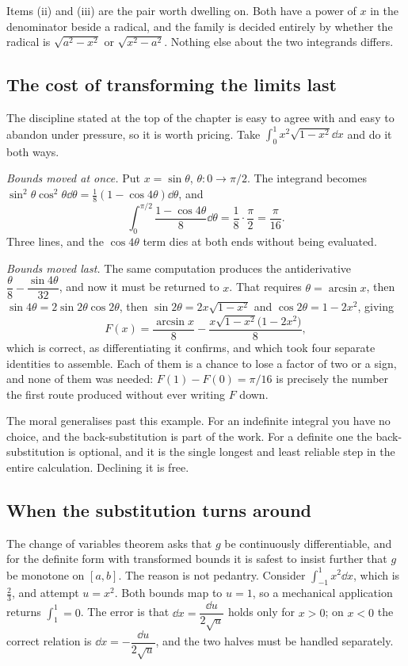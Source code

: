Items (ii) and (iii) are the pair worth dwelling on. Both have a power of $x$ in the denominator beside a radical, and the family is decided entirely by whether the radical is $\sqrt{a^2-x^2}$ or $\sqrt{x^2-a^2}$. Nothing else about the two integrands differs.

\subsection{The cost of transforming the limits last}

The discipline stated at the top of the chapter is easy to agree with and easy to abandon under pressure, so it is worth pricing. Take $\displaystyle\int_0^1x^2\sqrt{1-x^2}\dd x$ and do it both ways.

\emph{Bounds moved at once.} Put $x=\sin\theta$, $\theta:0\to\pi/2$. The integrand becomes $\sin^2\theta\cos^2\theta\dd\theta=\tfrac18(1-\cos4\theta)\dd\theta$, and
\[
\int_0^{\pi/2}\frac{1-\cos4\theta}{8}\dd\theta=\frac{1}{8}\cdot\frac{\pi}{2}=\frac{\pi}{16}.
\]
Three lines, and the $\cos4\theta$ term dies at both ends without being evaluated.

\emph{Bounds moved last.} The same computation produces the antiderivative $\dfrac{\theta}{8}-\dfrac{\sin4\theta}{32}$, and now it must be returned to $x$. That requires $\theta=\arcsin x$, then $\sin4\theta=2\sin2\theta\cos2\theta$, then $\sin2\theta=2x\sqrt{1-x^2}$ and $\cos2\theta=1-2x^2$, giving
\[
F(x)=\frac{\arcsin x}{8}-\frac{x\sqrt{1-x^2}\bigl(1-2x^2\bigr)}{8},
\]
which is correct, as differentiating it confirms, and which took four separate identities to assemble. Each of them is a chance to lose a factor of two or a sign, and none of them was needed: $F(1)-F(0)=\pi/16$ is precisely the number the first route produced without ever writing $F$ down.

The moral generalises past this example. For an indefinite integral you have no choice, and the back-substitution is part of the work. For a definite one the back-substitution is optional, and it is the single longest and least reliable step in the entire calculation. Declining it is free.

\subsection{When the substitution turns around}

The change of variables theorem asks that $g$ be continuously differentiable, and for the definite form with transformed bounds it is safest to insist further that $g$ be monotone on $[a,b]$. The reason is not pedantry. Consider $\int_{-1}^{1}x^2\dd x$, which is $\tfrac23$, and attempt $u=x^2$. Both bounds map to $u=1$, so a mechanical application returns $\int_1^1=0$. The error is that $\dd x=\dfrac{\dd u}{2\sqrt u}$ holds only for $x>0$; on $x<0$ the correct relation is $\dd x=-\dfrac{\dd u}{2\sqrt u}$, and the two halves must be handled separately.

